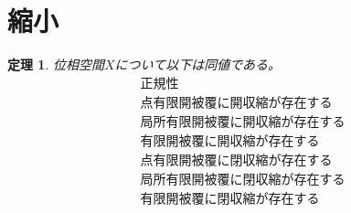 \documentclass[leqno]{jsarticle}
\newtheorem{thm}{定理}
\begin{document}
\section*{縮小}
\setcounter{equation}{0}
\begin{thm}
位相空間$X$について以下は同値である。
\begin{align}
&\mbox{正規性}\\ 
&\mbox{点有限開被覆に開収縮が存在する}\\ 
&\mbox{局所有限開被覆に開収縮が存在する}\\ 
&\mbox{有限開被覆に開収縮が存在する}\\ 
&\mbox{点有限開被覆に閉収縮が存在する}\\
&\mbox{局所有限開被覆に閉収縮が存在する}\\  
&\mbox{有限開被覆に閉収縮が存在する}
\end{align}
\end{thm}
\end{document}

